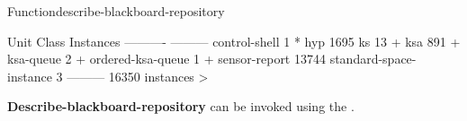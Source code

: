 \documentclass[10pt,twoside,english,pdftex]{article}
\begin{document}
\begin{functiondoc}{Function}{describe-blackboard-repository}{\noargs}
\begin{example}
  Unit Class                  Instances
  ----------                  ---------
  control-shell                       1 *
  hyp                              1695
  ks                                 13 + 
  ksa                               891 +
  ksa-queue                           2 +
  ordered-ksa-queue                   1 +
  sensor-report                   13744
  standard-space-instance             3
                              ---------
                                  16350 instances
>
\end{example}

\fnnote 
%
%
%
\textbf{Describe-blackboard-repository} can be invoked using the
 .

\end{functiondoc}

\end{document}
